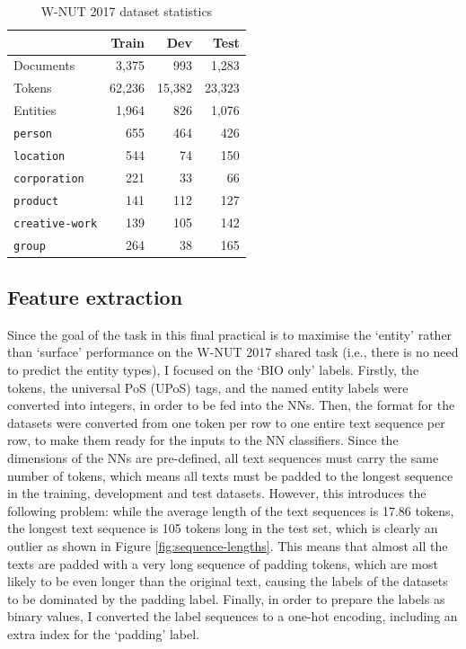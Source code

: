 \documentclass[11pt,a4paper]{article}
\begin{document}
\begin{table}
    \centering
    \begin{tabular}{lrrr}
        \hline 
        \textbf{} & \textbf{Train} & \textbf{Dev} & \textbf{Test} \\
        \hline
        Documents & 3,375 & 993 & 1,283 \\
        Tokens & 62,236 & 15,382 & 23,323 \\
        Entities & 1,964 & 826 & 1,076 \\
        \hline
        \texttt{person} & 655 & 464 & 426 \\
        \texttt{location} & 544 & 74 & 150 \\
        \texttt{corporation} & 221 & 33 & 66 \\
        \texttt{product} & 141 & 112 & 127 \\
        \texttt{creative-work} & 139 & 105 & 142 \\
        \texttt{group} & 264 & 38 & 165 \\
        \hline
    \end{tabular}
    \caption{W-NUT 2017 dataset statistics}
    \label{table:entity-counts}
\end{table}

\subsection{Feature extraction}

Since the goal of the task in this final practical is to maximise the `entity' rather than `surface' performance on the W-NUT 2017 shared task (i.e., there is no need to predict the entity types), I focused on the `BIO only' labels. Firstly, the tokens, the universal PoS (UPoS) tags, and the named entity labels were converted into integers, in order to be fed into the NNs. Then, the format for the datasets were converted from one token per row to one entire text sequence per row, to make them ready for the inputs to the NN classifiers. Since the dimensions of the NNs are pre-defined, all text sequences must carry the same number of tokens, which means all texts must be padded to the longest sequence in the training, development and test datasets. However, this introduces the following problem: while the average length of the text sequences is 17.86 tokens, the longest text sequence is 105 tokens long in the test set, which is clearly an outlier as shown in Figure \ref{fig:sequence-lengths}. This means that almost all the texts are padded with a very long sequence of padding tokens, which are most likely to be even longer than the original text, causing the labels of the datasets to be dominated by the padding label. Finally, in order to prepare the labels as binary values, I converted the label sequences to a one-hot encoding, including an extra index for the `padding' label.
\end{document}
